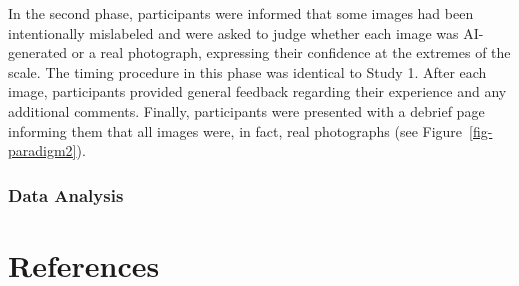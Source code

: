 \documentclass[
  jou,
  floatsintext,
  longtable,
  nolmodern,
  notxfonts,
  notimes,
  colorlinks=true,linkcolor=blue,citecolor=blue,urlcolor=blue]{apa7}
\begin{document}
In the second phase, participants were informed that some images had
been intentionally mislabeled and were asked to judge whether each image
was AI-generated or a real photograph, expressing their confidence at
the extremes of the scale. The timing procedure in this phase was
identical to Study 1. After each image, participants provided general
feedback regarding their experience and any additional comments.
Finally, participants were presented with a debrief page informing them
that all images were, in fact, real photographs (see
Figure~\ref{fig-paradigm2}).

\subsubsection{Data Analysis}\label{data-analysis}

\section{References}\label{references}
\end{document}
